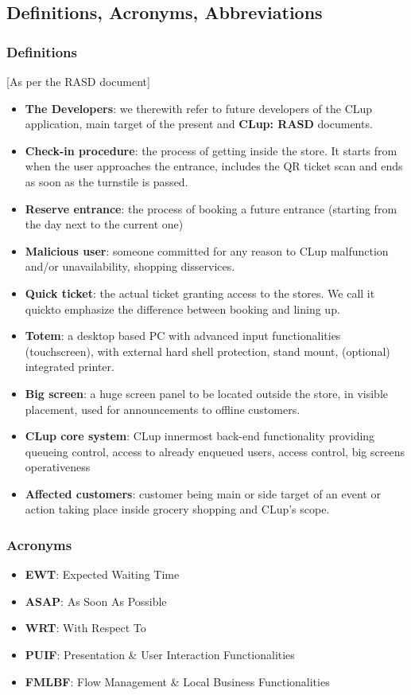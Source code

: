 \subsection{Definitions, Acronyms, Abbreviations}
\subsubsection{Definitions\label{subsub:definitions}}
[As per the RASD document]\newline
\begin{itemize}
\item \textbf{The Developers}: we therewith refer to future developers of the CLup application, main target of the present and \textbf{CLup: RASD} documents.
\item \textbf{Check-in procedure}: the process of getting inside the store. It starts from when the user approaches the entrance, includes the QR ticket scan and ends as soon as the turnstile is passed.
\item \textbf{Reserve entrance}: the process of booking a future entrance (starting from the day next to the current one)
\item \textbf{Malicious user}: someone committed for any reason to CLup malfunction and/or unavailability, shopping disservices.
\item \textbf{Quick ticket}: the actual ticket granting access to the stores. We call it \guillemotleft quick\guillemotright \space to emphasize the difference between booking and lining up.
\item \textbf{Totem}: a desktop based PC with advanced input functionalities (touchscreen), with external hard shell protection, stand mount, (optional) integrated printer.
\item \textbf{Big screen}: a huge screen panel to be located outside the store, in visible placement, used for announcements to offline customers.
\item \textbf{CLup core system\label{core_functionality}}: CLup innermost back-end functionality providing queueing control, access to already enqueued users, access control, big screens operativeness
\item \textbf{Affected customers\label{affected:def}}: customer being main or side target of an event or action taking place inside grocery shopping and CLup's scope.
\end{itemize}
\subsubsection{Acronyms}\label{def:acronyms}
\begin{itemize}
\item \textbf{EWT}: Expected Waiting Time
\item \textbf{ASAP}: As Soon As Possible
\item \textbf{WRT}: With Respect To
\item \textbf{PUIF}: Presentation \& User Interaction Functionalities
\item \textbf{FMLBF}: Flow Management \& Local Business Functionalities
\end{itemize}

